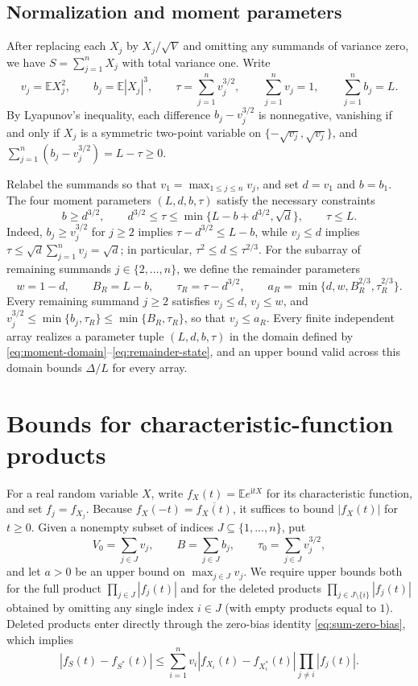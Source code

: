 \documentclass[11pt]{article}
\numberwithin{equation}{section}
\theoremstyle{remark}
\newcommand{\E}{\mathbb E}
\newcommand{\ii}{\mathrm i}
\begin{document}
\subsection{Normalization and moment parameters}

After replacing each $X_j$ by $X_j/\sqrt V$ and omitting any summands of
variance zero, we have $S=\sum_{j=1}^nX_j$ with total variance one. Write
\[
 v_j=\E X_j^2,\qquad b_j=\E|X_j|^3,\qquad
 \tau=\sum_{j=1}^nv_j^{3/2},\qquad \sum_{j=1}^nv_j=1,\qquad \sum_{j=1}^nb_j=L.
\]
By Lyapunov's inequality, each difference $b_j-v_j^{3/2}$ is nonnegative,
vanishing if and only if $X_j$ is a symmetric two-point variable on
$\{-\sqrt{v_j},\sqrt{v_j}\}$, and $\sum_{j=1}^n(b_j-v_j^{3/2})=L-\tau\ge0$.

Relabel the summands so that $v_1=\max_{1\le j\le n}v_j$, and set $d=v_1$
and $b=b_1$. The four moment parameters $(L,d,b,\tau)$ satisfy the necessary
constraints
\begin{equation}\label{eq:moment-domain}
 b\ge d^{3/2},\qquad
 d^{3/2}\le\tau\le\min\{L-b+d^{3/2},\sqrt d\},\qquad \tau\le L.
\end{equation}
Indeed, $b_j\ge v_j^{3/2}$ for $j\ge2$ implies $\tau-d^{3/2}\le L-b$, while
$v_j\le d$ implies $\tau\le\sqrt d\sum_{j=1}^nv_j=\sqrt d$; in particular,
$\tau^2\le d\le\tau^{2/3}$. For the subarray of remaining summands
$j\in\{2,\ldots,n\}$, we define the remainder parameters
\begin{equation}\label{eq:remainder-state}
 w=1-d,\qquad B_R=L-b,\qquad \tau_R=\tau-d^{3/2},\qquad
 a_R=\min\{d,w,B_R^{2/3},\tau_R^{2/3}\}.
\end{equation}
Every remaining summand $j\ge2$ satisfies $v_j\le d$, $v_j\le w$, and
$v_j^{3/2}\le\min\{b_j,\tau_R\}\le\min\{B_R,\tau_R\}$, so that $v_j\le a_R$.
Every finite independent array realizes a parameter tuple $(L,d,b,\tau)$ in
 the domain defined by \eqref{eq:moment-domain}--\eqref{eq:remainder-state},
and an upper bound valid across this domain bounds $\Delta/L$ for every
array.

\section{Bounds for characteristic-function products}\label{sec:products}

For a real random variable $X$, write $f_X(t)=\E e^{\ii tX}$ for its
characteristic function, and set $f_j=f_{X_j}$. Because
$f_X(-t)=\overline{f_X(t)}$, it suffices to bound $|f_X(t)|$ for $t\ge0$.
Given a nonempty subset of indices $J\subseteq\{1,\ldots,n\}$, put
\[
 V_0=\sum_{j\in J}v_j,\qquad B=\sum_{j\in J}b_j,\qquad
 \tau_0=\sum_{j\in J}v_j^{3/2},
\]
and let $a>0$ be an upper bound on $\max_{j\in J}v_j$. We require upper
bounds both for the full product $\prod_{j\in J}|f_j(t)|$ and for the
deleted products $\prod_{j\in J\setminus\{i\}}|f_j(t)|$ obtained by omitting
any single index $i\in J$ (with empty products equal to $1$). Deleted
products enter directly through the zero-bias identity \eqref{eq:sum-zero-bias},
which implies
\[
 |f_S(t)-f_{S^*}(t)|\le
 \sum_{i=1}^n v_i|f_{X_i}(t)-f_{X_i^*}(t)|\prod_{j\ne i}|f_j(t)|.
\]
\end{document}
